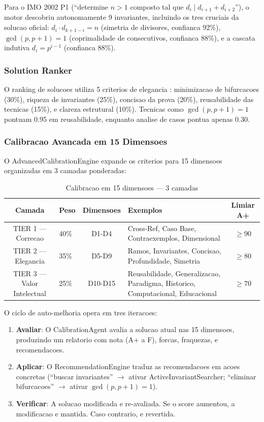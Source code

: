 \documentclass[5p]{elsarticle}
\begin{document}
Para o IMO 2002 P1 (``determine $n>1$ composto tal que $d_i\mid d_{i+1}+d_{i+2}$''),
o motor descobriu autonomamente 9 invariantes, incluindo os tres cruciais da
solucao oficial: $d_i\cdot d_{k+1-i}=n$ (simetria de divisores, confianca 92\%),
$\gcd(p,p+1)=1$ (coprimalidade de consecutivos, confianca 88\%), e a cascata
indutiva $d_i=p^{i-1}$ (confianca 88\%).

\subsubsection{Solution Ranker}

O ranking de solucoes utiliza 5 criterios de elegancia \cite{hardy1940,polya1954}:
minimizacao de bifurcacoes (30\%), riqueza de invariantes (25\%), concisao da
prova (20\%), reusabilidade das tecnicas (15\%), e clareza estrutural (10\%).
Tecnicas como $\gcd(p,p+1)=1$ pontuam 0.95 em reusabilidade, enquanto analise
de casos pontua apenas 0.30.

\subsubsection{Calibracao Avancada em 15 Dimensoes}

O AdvancedCalibrationEngine expande os criterios para 15 dimensoes organizadas
em 3 camadas ponderadas:

\begin{table}[H]
  \centering
  \caption{Calibracao em 15 dimensoes — 3 camadas}
  \label{tab:cal15}
  \small
  \begin{tabular}{clcp{3cm}c}
    \toprule
    \textbf{Camada} & \textbf{Peso} & \textbf{Dimensoes} & \textbf{Exemplos} & \textbf{Limiar A+} \\
    \midrule
    TIER 1 — Correcao & 40\% & D1-D4 & Cross-Ref, Caso Base, Contraexemplos, Dimensional & $\geq 90$ \\
    \rowcolor{bluebg}
    TIER 2 — Elegancia & 35\% & D5-D9 & Ramos, Invariantes, Concisao, Profundidade, Simetria & $\geq 80$ \\
    TIER 3 — Valor Intelectual & 25\% & D10-D15 & Reusabilidade, Generalizacao, Paradigma, Historico, Computacional, Educacional & $\geq 70$ \\
    \bottomrule
  \end{tabular}
\end{table}

O ciclo de auto-melhoria opera em tres iteracoes:

\begin{enumerate}[label=Iteracao \arabic*:]
  \item \textbf{Avaliar}: O CalibrationAgent avalia a solucao atual nas 15
    dimensoes, produzindo um relatorio com nota (A+ a F), forcas, fraquezas,
    e recomendacoes.
  \item \textbf{Aplicar}: O RecommendationEngine traduz as recomendacoes em
    acoes concretas (``buscar invariantes'' $\to$ ativar ActiveInvariantSearcher;
    ``eliminar bifurcacoes'' $\to$ ativar $\gcd(p,p+1)=1$).
  \item \textbf{Verificar}: A solucao modificada e re-avaliada. Se o score
    aumentou, a modificacao e mantida. Caso contrario, e revertida.
\end{enumerate}
\end{document}
